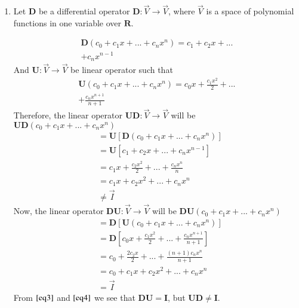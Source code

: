 \documentclass[journal,12pt,twocolumn]{IEEEtran}
\begin{document}
\begin{enumerate}
		
		\item Let $\mathbf{D}$ be a differential operator $\mathbf{D} : \Vec{V} \xrightarrow{} \Vec{V}$, where $\vec{V}$ is a space of polynomial functions in one variable over $\mathbf{R}$.
		
		\begin{align}
			\mathbf{D}\left( c_0 + c_1x + ... + c_nx^{n}\right) = c_1 + c_2x + ... \nonumber\\+ c_nx^{n-1}
		\end{align}
		And $\mathbf{U} : \Vec{V} \xrightarrow{} \Vec{V}$ be linear operator such that
		\begin{align}
			\mathbf{U}\left( c_0 + c_1x + ... + c_nx^{n}\right) = c_0x + \frac{c_1x^{2}}{2} + ... \nonumber\\+ \frac{c_nx^{n+1}}{n+1}
		\end{align}
		Therefore, the linear operator $\mathbf{U}\mathbf{D} : \Vec{V} \xrightarrow{} \Vec{V}$ will be $\mathbf{U}\mathbf{D}\left( c_0 + c_1x + ... + c_nx^{n}\right)$
		\begin{align}\label{eq3}
			&= \mathbf{U}\left[\mathbf{D}\left( c_0 + c_1x + ... + c_nx^{n}\right)\right] \nonumber\\
			&= \mathbf{U}\left[c_1 + c_2x + ... + c_nx^{n-1}\right]\nonumber\\
			&= c_1x + \frac{c_2x^{2}}{2} + ... + \frac{c_nx^{n}}{n}\nonumber\\
			&= c_1x + c_2x^{2} + ... + c_nx^{n}\nonumber\\
			&\neq \vec{I}
		\end{align}
		Now, the linear operator $\mathbf{D}\mathbf{U} : \Vec{V} \xrightarrow{} \Vec{V}$ will be $\mathbf{D}\mathbf{U}\left( c_0 + c_1x + ... + c_nx^{n}\right)$
		\begin{align}\label{eq4}
			&= \mathbf{D}\left[\mathbf{U}\left( c_0 + c_1x + ... + c_nx^{n}\right)\right] \nonumber\\
			&= \mathbf{D}\left[c_0x + \frac{c_1x^{2}}{2} + ... + \frac{c_nx^{n+1}}{n+1}\right]\nonumber\\
			&= c_0 + \frac{2c_2x}{2} + ... + \frac{\left( n+1\right)c_nx^{n}}{n+1}\nonumber\\
			&= c_0 + c_1x + c_2x^{2} + ... + c_nx^{n}\nonumber\\
			&= \vec{I}
		\end{align}
		From $\eqref{eq3}$ and $\eqref{eq4}$ we see that $\mathbf{D}\mathbf{U} = \mathbf{I}$, but $\mathbf{U}\mathbf{D} \neq \mathbf{I}$. 
	\end{enumerate}
\end{document}
